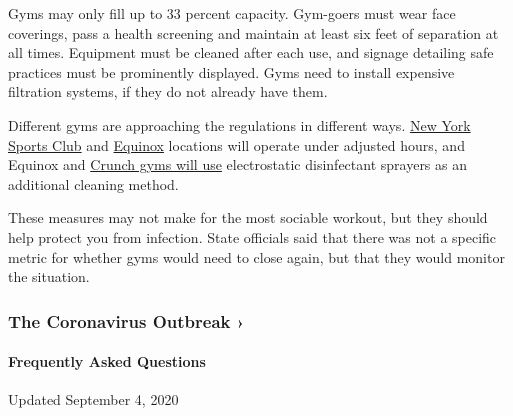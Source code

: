 Gyms may only fill up to 33 percent capacity. Gym-goers must wear face
coverings, pass a health screening and maintain at least six feet of
separation at all times. Equipment must be cleaned after each use, and
signage detailing safe practices must be prominently displayed. Gyms
need to install expensive filtration systems, if they do not already
have them.

Different gyms are approaching the regulations in different ways.
\href{https://www.newyorksportsclubs.com/page/nysc-club-health-updates}{New
York Sports Club} and
\href{https://www.equinox.com/page/theequinoxstandard}{Equinox}
locations will operate under adjusted hours, and Equinox and
\href{https://info.crunch.com/member-updates}{Crunch gyms will use}
electrostatic disinfectant sprayers as an additional cleaning method.

These measures may not make for the most sociable workout, but they
should help protect you from infection. State officials said that there
was not a specific metric for whether gyms would need to close again,
but that they would monitor the situation.

\href{https://www.nytimes3xbfgragh.onion/news-event/coronavirus?action=click\&pgtype=Article\&state=default\&region=MAIN_CONTENT_3\&context=storylines_faq}{}

\hypertarget{the-coronavirus-outbreak-}{%
\subsubsection{The Coronavirus Outbreak
›}\label{the-coronavirus-outbreak-}}

\hypertarget{frequently-asked-questions}{%
\paragraph{Frequently Asked
Questions}\label{frequently-asked-questions}}

Updated September 4, 2020

